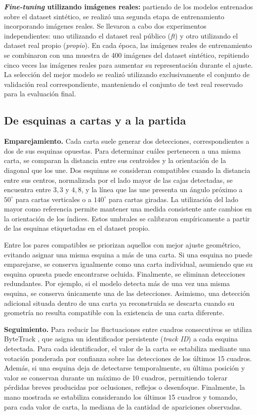 \documentclass[conference,a4paper]{IEEEtran}
\begin{document}
\textbf{\textit{Fine-tuning} utilizando imágenes reales:} partiendo de los modelos entrenados sobre el dataset sintético, se realizó una segunda etapa de entrenamiento incorporando imágenes reales. Se llevaron a cabo dos experimentos independientes: uno utilizando el dataset real público (\emph{ft}) y otro utilizando el dataset real propio (\emph{propio}). En cada época, las imágenes reales de entrenamiento se combinaron con una muestra de 400 imágenes del dataset sintético, repitiendo cinco veces las imágenes reales para aumentar su representación durante el ajuste. La selección del mejor modelo se realizó utilizando exclusivamente el conjunto de validación real correspondiente, manteniendo el conjunto de test real reservado para la evaluación final.

\subsection{De esquinas a cartas y a la partida}
\textbf{Emparejamiento.} Cada carta suele generar dos detecciones, correspondientes a dos de sus esquinas opuestas. Para determinar cuáles pertenecen a una misma carta, se comparan la distancia entre sus centroides y la orientación de la diagonal que los une. Dos esquinas se consideran compatibles cuando la distancia entre sus centros, normalizada por el lado mayor de las cajas detectadas, se encuentra entre $3{,}3$ y $4{,}8$, y la línea que las une presenta un ángulo próximo a $50^\circ$ para cartas verticales o a $140^\circ$ para cartas giradas. La utilización del lado mayor como referencia permite mantener una medida consistente ante cambios en la orientación de los índices. Estos umbrales se calibraron empíricamente a partir de las esquinas etiquetadas en el dataset propio.

Entre los pares compatibles se priorizan aquellos con mejor ajuste geométrico, evitando asignar una misma esquina a más de una carta. Si una esquina no puede emparejarse, se conserva igualmente como una carta individual, asumiendo que su esquina opuesta puede encontrarse ocluida. Finalmente, se eliminan detecciones redundantes. Por ejemplo, si el modelo detecta más de una vez una misma esquina, se conserva únicamente una de las detecciones. Asimismo, una detección adicional situada dentro de una carta ya reconstruida se descarta cuando su geometría no resulta compatible con la existencia de una carta diferente.

\textbf{Seguimiento.} Para reducir las fluctuaciones entre cuadros consecutivos se utiliza ByteTrack \cite{zhang2022bytetrack}, que asigna un identificador persistente (\emph{track ID}) a cada esquina detectada. Para cada identificador, el valor de la carta se estabiliza mediante una votación ponderada por confianza sobre las detecciones de los últimos 15 cuadros. Además, si una esquina deja de detectarse temporalmente, su última posición y valor se conservan durante un máximo de 10 cuadros, permitiendo tolerar pérdidas breves producidas por oclusiones, reflejos o desenfoque. Finalmente, la mano mostrada se estabiliza considerando los últimos 15 cuadros y tomando, para cada valor de carta, la mediana de la cantidad de apariciones observadas.
\end{document}
